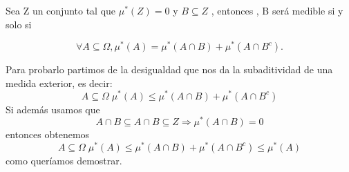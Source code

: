 
Sea Z un conjunto tal que $\mu^* (Z) = 0 $ y $B \subseteq Z$ , entonces , B ser\'a  medible si y solo si 

\[\forall A \subseteq \Omega , \mu^* (A) = \mu^* (A\cap B) + \mu^* (A \cap  B^c).\]

Para probarlo partimos de la desigualdad que nos da la subaditividad de una medida exterior, es decir:
\[A \subseteq \Omega \; \mu^* (A) \leq \mu^* (A \cap B) + \mu^* (A\cap B^c)\]
Si además usamos que\: 
\[A \cap B \subseteq A \cap  B \subseteq Z \Rightarrow  \mu^* (A \cap  B) = 0\]
 entonces obtenemos 
\[A \subseteq \Omega \; \mu^* (A) \leq \mu^* (A \cap  B) + \mu^* (A\cap B^c) \leq  \mu^* (A)\] como queríamos demostrar. 